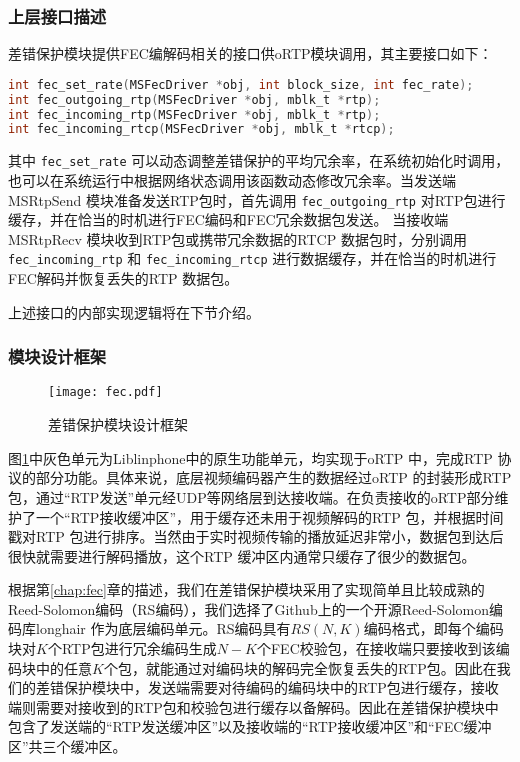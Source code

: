     \subsubsection{上层接口描述}
    差错保护模块提供FEC编解码相关的接口供oRTP模块调用，其主要接口如下：
    \begin{lstlisting}[language=C]
int fec_set_rate(MSFecDriver *obj, int block_size, int fec_rate);
int fec_outgoing_rtp(MSFecDriver *obj, mblk_t *rtp);
int fec_incoming_rtp(MSFecDriver *obj, mblk_t *rtp);
int fec_incoming_rtcp(MSFecDriver *obj, mblk_t *rtcp);
    \end{lstlisting}

    其中 \lstinline!fec_set_rate! 可以动态调整差错保护的平均冗余率，在系统初始化时调用，也可以在系统运行中根据网络状态调用该函数动态修改冗余率。当发送端 MSRtpSend 模块准备发送RTP包时，首先调用 \lstinline!fec_outgoing_rtp! 对RTP包进行缓存，并在恰当的时机进行FEC编码和FEC冗余数据包发送。 当接收端 MSRtpRecv 模块收到RTP包或携带冗余数据的RTCP 数据包时，分别调用 \lstinline!fec_incoming_rtp! 和 \lstinline!fec_incoming_rtcp! 进行数据缓存，并在恰当的时机进行FEC解码并恢复丢失的RTP 数据包。
    
    上述接口的内部实现逻辑将在下节介绍。

    \subsubsection{模块设计框架}
    \begin{figure}[htbp]
      \centering
      \texttt{[image: fec.pdf]}
      \caption{差错保护模块设计框架}
      \label{fig:fec_arch}
    \end{figure}

    图\ref{fig:fec_arch}中灰色单元为Liblinphone中的原生功能单元，均实现于oRTP 中，完成RTP 协议的部分功能。具体来说，底层视频编码器产生的数据经过oRTP 的封装形成RTP 包，通过``RTP发送''单元经UDP等网络层到达接收端。在负责接收的oRTP部分维护了一个``RTP接收缓冲区''，用于缓存还未用于视频解码的RTP 包，并根据时间戳对RTP 包进行排序。当然由于实时视频传输的播放延迟非常小，数据包到达后很快就需要进行解码播放，这个RTP 缓冲区内通常只缓存了很少的数据包。

    根据第\ref{chap:fec}章的描述，我们在差错保护模块采用了实现简单且比较成熟的Reed-Solomon编码（RS编码），我们选择了Github上的一个开源Reed-Solomon编码库longhair\cite{website:longhair} 作为底层编码单元。RS编码具有$RS(N,K)$编码格式，即每个编码块对$K$个RTP包进行冗余编码生成$N-K$个FEC校验包，在接收端只要接收到该编码块中的任意$K$个包，就能通过对编码块的解码完全恢复丢失的RTP包。因此在我们的差错保护模块中，发送端需要对待编码的编码块中的RTP包进行缓存，接收端则需要对接收到的RTP包和校验包进行缓存以备解码。因此在差错保护模块中包含了发送端的``RTP发送缓冲区''以及接收端的``RTP接收缓冲区''和``FEC缓冲区''共三个缓冲区。

